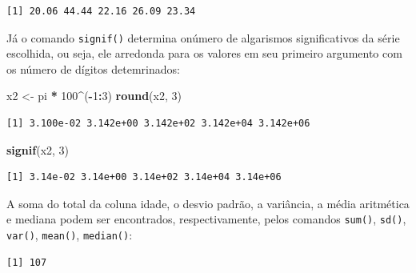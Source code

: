 \documentclass[12pt,brazil,oneside]{book}
\newenvironment{Shaded}{\begin{snugshade}}{\end{snugshade}}
\newcommand{\CommentTok}[1]{\textcolor[rgb]{0.56,0.35,0.01}{\textit{#1}}}
\newcommand{\DecValTok}[1]{\textcolor[rgb]{0.00,0.00,0.81}{#1}}
\newcommand{\KeywordTok}[1]{\textcolor[rgb]{0.13,0.29,0.53}{\textbf{#1}}}
\newcommand{\NormalTok}[1]{#1}
\newcommand{\OperatorTok}[1]{\textcolor[rgb]{0.81,0.36,0.00}{\textbf{#1}}}
\newcommand{\StringTok}[1]{\textcolor[rgb]{0.31,0.60,0.02}{#1}}
\begin{document}
\begin{verbatim}
[1] 20.06 44.44 22.16 26.09 23.34
\end{verbatim}

Já o comando \texttt{signif()} determina onúmero de algarismos
significativos da série escolhida, ou seja, ele arredonda para os
valores em seu primeiro argumento com os número de dígitos detemrinados:

\begin{Shaded}
\begin{Highlighting}[]
\NormalTok{x2 <-}\StringTok{ }\NormalTok{pi }\OperatorTok{*}\StringTok{ }\DecValTok{100}\OperatorTok{^}\NormalTok{(}\OperatorTok{-}\DecValTok{1}\OperatorTok{:}\DecValTok{3}\NormalTok{)}
\KeywordTok{round}\NormalTok{(x2, }\DecValTok{3}\NormalTok{)}
\end{Highlighting}
\end{Shaded}

\begin{verbatim}
[1] 3.100e-02 3.142e+00 3.142e+02 3.142e+04 3.142e+06
\end{verbatim}

\begin{Shaded}
\begin{Highlighting}[]
\KeywordTok{signif}\NormalTok{(x2, }\DecValTok{3}\NormalTok{) }
\end{Highlighting}
\end{Shaded}

\begin{verbatim}
[1] 3.14e-02 3.14e+00 3.14e+02 3.14e+04 3.14e+06
\end{verbatim}

A soma do total da coluna idade, o desvio padrão, a variância, a média
aritmética e mediana podem ser encontrados, respectivamente, pelos
comandos \texttt{sum()}, \texttt{sd()}, \texttt{var()}, \texttt{mean()},
\texttt{median()}:

\begin{Shaded}
\end{Shaded}

\begin{verbatim}
[1] 107
\end{verbatim}

\begin{Shaded}
\end{Shaded}
\end{document}

